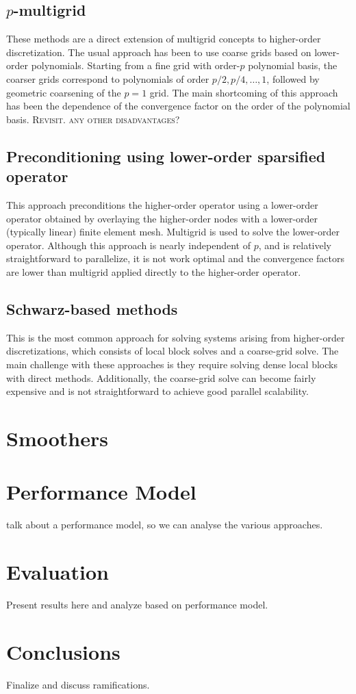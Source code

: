 \documentclass[times]{nlaauth}
\begin{document}
\subsection{$p$-multigrid}
These methods are a direct extension of multigrid concepts to
higher-order discretization. The usual approach has been to use coarse
grids based on lower-order polynomials. Starting from a fine grid with
order-$p$ polynomial basis, the coarser grids correspond to
polynomials of order $p/2, p/4,\ldots,1$, followed by geometric
coarsening of the $p=1$ grid. The main shortcoming of this approach
has been the dependence of the convergence factor on the order of the
polynomial basis. \textsc{Revisit. any other disadvantages}?


\subsection{Preconditioning using lower-order sparsified operator}
This approach preconditions the higher-order operator using a
lower-order operator obtained by overlaying the higher-order nodes
with a lower-order (typically linear) finite element mesh. Multigrid
is used to solve the lower-order operator. Although this approach is
nearly independent of $p$, and is relatively straightforward to
parallelize, it is not work optimal and the convergence factors are
lower than multigrid applied directly to the higher-order operator.

\subsection{Schwarz-based methods}
This is the most common approach for solving systems arising from
higher-order discretizations, which consists of local block solves and
a coarse-grid solve. The main challenge with these approaches is they
require solving dense local blocks with direct methods. Additionally,
the coarse-grid solve can become fairly expensive and is not
straightforward to achieve good parallel scalability.


\section{Smoothers}



\section{Performance Model}

talk about a performance model, so we can analyse the various approaches.

\section{Evaluation}

Present results here and analyze based on performance model.



\section{Conclusions}

Finalize and discuss ramifications.




\end{document}

